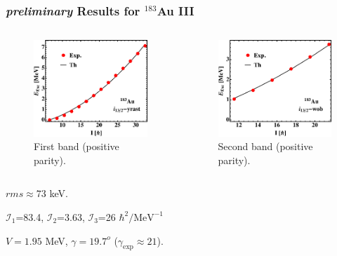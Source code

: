 \documentclass{beamer}
\begin{document}
\begin{frame}
    \frametitle{{\tiny \emph{preliminary}} Results for $^{183}$Au III}
    \begin{columns}[c] 
     \begin{figure}
         \centering
         \includegraphics[scale=0.4]{figs/Au_183_plot1Positive.pdf}
         \caption{First band (positive parity).}
     \end{figure}
     \begin{figure}
         \centering
         \includegraphics[scale=0.4]{figs/Au_183_plot2Positive.pdf}
         \caption{Second band (positive parity).}
     \end{figure}
    \end{columns}
    \par $rms\approx73$ keV.
    \par $\mathcal{I}_1$=83.4, $\mathcal{I}_2$=3.63, $\mathcal{I}_3$=26 $\hbar^2/\text{MeV}^{-1}$
    \par $V=1.95$ MeV, $\gamma=19.7^o$ ($\gamma_\text{exp}\approx 21$).
\end{frame}
\end{document}
